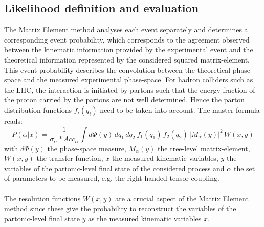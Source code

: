 \subsection{Likelihood definition and evaluation} \label{subsec::MWLik}

The Matrix Element method analyses each event separately and determines a corresponding event probability, which corresponds to the agreement observed between the kinematic information provided by the experimental event and the theoretical information represented by the considered squared matrix-element. 
This event probability describes the convolution between the theoretical phase-space and the measured experimental phase-space.
For hadron colliders such as the LHC, the interaction is initiated by partons such that the energy fraction of the proton carried by the partons are not well determined. Hence the parton distribution functions $f_i(q_i)$ need to be taken into account. %
The master formula reads:
\begin{equation} \label{eq::MWEvtProb}
 P(\alpha \vert x) = \frac{1}{\sigma_{\alpha}*Acc_{\alpha}} \int d\Phi(y) \, dq_{1} \, dq_{2} ~ f_{1}(q_{1}) \, f_{2}(q_{2}) \, \vert M_{\alpha}(y) \vert^{2} \, W(x,y)
\end{equation}
with $d\Phi(y)$ the phase-space measure, $M_{\alpha}(y)$ the tree-level matrix-element, $W(x,y)$ the transfer function, $x$ the measured kinematic variables, $y$ the variables of the partonic-level final state of the considered process and $\alpha$ the set of parameters to be measured, e.g. the right-handed tensor coupling.
\\
\\
The resolution functions $W(x,y)$ are a crucial aspect of the Matrix Element method since these give the probability to reconstruct the variables of the partonic-level final state $y$ as the measured kinematic variables $x$.
